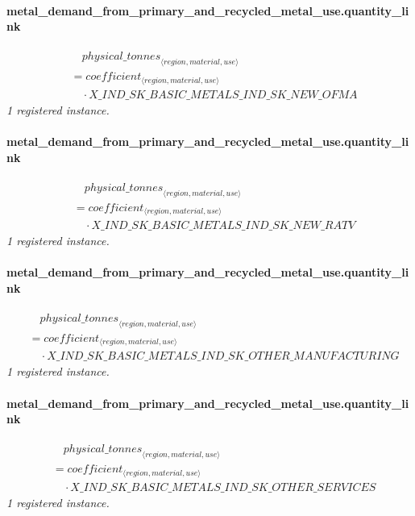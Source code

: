 \documentclass[11pt]{article}
\begin{document}
\paragraph{metal\_demand\_from\_primary\_and\_recycled\_metal\_use.quantity\_link}
\begin{align*}
&\quad {physical\_tonnes}_{\langle region, material, use\rangle}\\
&= coefficient_{\langle region, material, use\rangle}\\
&\quad {}\cdot X\_IND\_SK\_BASIC\_METALS\_IND\_SK\_NEW\_OFMA
\end{align*}
\noindent\emph{1 registered instance.}\par
\paragraph{metal\_demand\_from\_primary\_and\_recycled\_metal\_use.quantity\_link}
\begin{align*}
&\quad {physical\_tonnes}_{\langle region, material, use\rangle}\\
&= coefficient_{\langle region, material, use\rangle}\\
&\quad {}\cdot X\_IND\_SK\_BASIC\_METALS\_IND\_SK\_NEW\_RATV
\end{align*}
\noindent\emph{1 registered instance.}\par
\paragraph{metal\_demand\_from\_primary\_and\_recycled\_metal\_use.quantity\_link}
\begin{align*}
&\quad {physical\_tonnes}_{\langle region, material, use\rangle}\\
&= coefficient_{\langle region, material, use\rangle}\\
&\quad {}\cdot X\_IND\_SK\_BASIC\_METALS\_IND\_SK\_OTHER\_MANUFACTURING
\end{align*}
\noindent\emph{1 registered instance.}\par
\paragraph{metal\_demand\_from\_primary\_and\_recycled\_metal\_use.quantity\_link}
\begin{align*}
&\quad {physical\_tonnes}_{\langle region, material, use\rangle}\\
&= coefficient_{\langle region, material, use\rangle}\\
&\quad {}\cdot X\_IND\_SK\_BASIC\_METALS\_IND\_SK\_OTHER\_SERVICES
\end{align*}
\noindent\emph{1 registered instance.}\par
\end{document}
